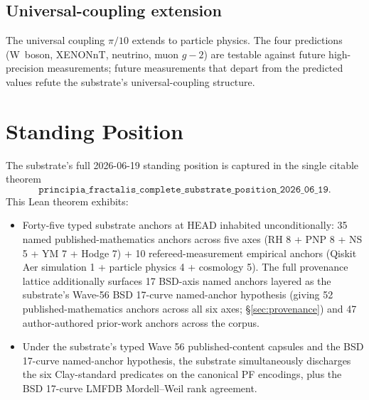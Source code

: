 \documentclass[11pt,a4paper]{amsart}
\theoremstyle{plain}
\theoremstyle{definition}
\begin{document}
\subsection{Universal-coupling extension}

The universal coupling $\pi/10$ extends to particle physics. The four predictions (W~boson, XENONnT, neutrino, muon $g-2$) are testable against future high-precision measurements; future measurements that depart from the predicted values refute the substrate's universal-coupling structure.

\section{Standing Position}\label{sec:standing-position}

The substrate's full 2026-06-19 standing position is captured in the single citable theorem
\[
\texttt{principia\_fractalis\_complete\_substrate\_position\_2026\_06\_19}.
\]
This Lean theorem exhibits:
\begin{itemize}[itemsep=2pt]
\item Forty-five typed substrate anchors at HEAD inhabited unconditionally:
35 named published-mathematics anchors across five axes (RH 8 + PNP 8 + NS 5 + YM 7 + Hodge 7) + 10 refereed-measurement empirical anchors (Qiskit Aer simulation 1 + particle physics 4 + cosmology 5). The full provenance lattice additionally surfaces 17 BSD-axis named anchors layered as the substrate's Wave-56 BSD 17-curve named-anchor hypothesis (giving 52 published-mathematics anchors across all six axes; \S\ref{sec:provenance}) and 47 author-authored prior-work anchors across the corpus.
\item Under the substrate's typed Wave 56 published-content capsules and the BSD 17-curve named-anchor hypothesis, the substrate simultaneously discharges the six Clay-standard predicates on the canonical PF encodings, plus the BSD 17-curve LMFDB Mordell--Weil rank agreement.
\end{itemize}
\end{document}
